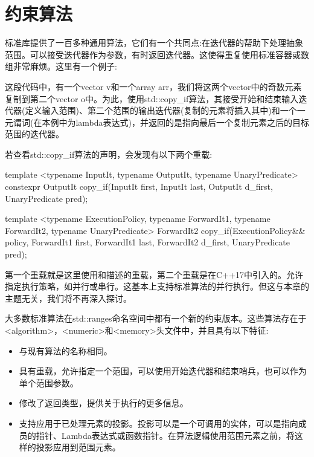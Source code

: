 \section{约束算法}
标准库提供了一百多种通用算法，它们有一个共同点:在迭代器的帮助下处理抽象范围。可以接受迭代器作为参数，有时返回迭代器。这使得重复使用标准容器或数组非常麻烦。这里有一个例子:


这段代码中，有一个vector v和一个array arr，我们将这两个vector中的奇数元素复制到第二个vector o中。为此，使用std::copy\_if算法，其接受开始和结束输入迭代器(定义输入范围)、第二个范围的输出迭代器(复制的元素将插入其中)和一个一元谓词(在本例中为lambda表达式)，并返回的是指向最后一个复制元素之后的目标范围的迭代器。

若查看std::copy\_if算法的声明，会发现有以下两个重载:

\begin{cpp}
template <typename InputIt, typename OutputIt,
		  typename UnaryPredicate>
constexpr OutputIt copy_if(InputIt first, InputIt last,
						   OutputIt d_first,
						   UnaryPredicate pred);
						   
template <typename ExecutionPolicy,
		  typename ForwardIt1, typename ForwardIt2,
		  typename UnaryPredicate>
ForwardIt2 copy_if(ExecutionPolicy&& policy,
				   ForwardIt1 first, ForwardIt1 last,
				   ForwardIt2 d_first,
				   UnaryPredicate pred);
\end{cpp}

第一个重载就是这里使用和描述的重载，第二个重载是在C++17中引入的。允许指定执行策略，如并行或串行。这基本上支持标准算法的并行执行。但这与本章的主题无关，我们将不再深入探讨。

大多数标准算法在std::ranges命名空间中都有一个新的约束版本。这些算法存在于<algorithm>，<numeric>和<memory>头文件中，并且具有以下特征:

\begin{itemize}
\item
与现有算法的名称相同。

\item
具有重载，允许指定一个范围，可以使用开始迭代器和结束哨兵，也可以作为单个范围参数。

\item
修改了返回类型，提供关于执行的更多信息。

\item
支持应用于已处理元素的投影。投影可以是一个可调用的实体，可以是指向成员的指针、Lambda表达式或函数指针。在算法逻辑使用范围元素之前，将这样的投影应用到范围元素。
\end{itemize}

